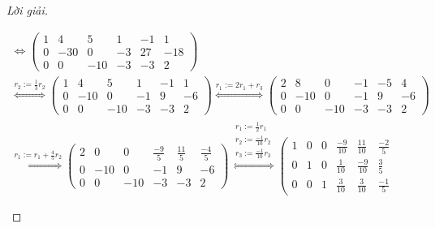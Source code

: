 \documentclass[class=linear-algebra,crop=false]{standalone}
\begin{document}
\begin{proof}[Lời giải]
\begin{enumerate}[label = (\alph*)]
\begin{gather*}
{			      }{\Longleftrightarrow}
			      \left(\begin{array}{ccc|ccc}
					      1 & 4   & 5   & 1  & -1 & 1   \\
					      0 & -30 & 0   & -3 & 27 & -18 \\
					      0 & 0   & -10 & -3 & -3 & 2
				      \end{array}
			      \right) \\
			      \stackrel{
			      r_{2}:= \frac{1}{3}r_{2}
			      }{\Longleftrightarrow}
			      \left(\begin{array}{ccc|ccc}
					      1 & 4   & 5   & 1  & -1 & 1  \\
					      0 & -10 & 0   & -1 & 9  & -6 \\
					      0 & 0   & -10 & -3 & -3 & 2
				      \end{array}
			      \right)
			      \stackrel{
				      r_{1}:= 2r_{1} + r_{3}
			      }{\Longleftrightarrow}
			      \left(\begin{array}{ccc|ccc}
					      2 & 8   & 0   & -1 & -5 & 4  \\
					      0 & -10 & 0   & -1 & 9  & -6 \\
					      0 & 0   & -10 & -3 & -3 & 2
				      \end{array}
			      \right) \\
			      \stackrel{
			      r_{1}:= r_{1} + \frac{4}{5}r_{2}
			      }{\Longleftrightarrow}
			      \left(\begin{array}{ccc|ccc}
					      2 & 0   & 0   & \frac{-9}{5} & \frac{11}{5} & \frac{-4}{5} \\
					      0 & -10 & 0   & -1           & 9            & -6           \\
					      0 & 0   & -10 & -3           & -3           & 2
				      \end{array}
			      \right)
			      \stackrel{
			      \substack{
			      r_{1}:= \frac{1}{2}r_{1} \\
			      r_{2}:= \frac{-1}{10}r_{2} \\
			      r_{3}:= \frac{-1}{10}r_{3}
			      }
			      }{\Longleftrightarrow}
			      \left(\begin{array}{ccc|ccc}
					      1 & 0 & 0 & \frac{-9}{10} & \frac{11}{10} & \frac{-2}{5} \\
					      0 & 1 & 0 & \frac{1}{10}  & \frac{-9}{10} & \frac{3}{5}  \\
					      0 & 0 & 1 & \frac{3}{10}  & \frac{3}{10}  & \frac{-1}{5}
				      \end{array}

\end{gather*}
\end{enumerate}
\end{proof}
\end{document}
